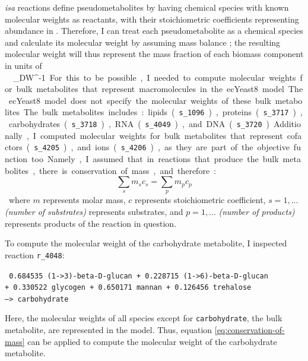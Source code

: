 \textit{isa} reactions define pseudometabolites by having chemical species with known molecular weights as reactants, with their stoichiometric coefficients representing abundance in \SI{}{\mmolgdw}.
Therefore, I can treat each pseudometabolite as a chemical species and calculate its molecular weight by assuming mass balance \parencite{chanStandardizingBiomassReactions2017, dinhQuantifyingPropagationParametric2022, takhaveevTemporalSegregationBiosynthetic2023};
the resulting molecular weight will thus represent the mass fraction of each biomass component in units of \SI{}{\gram~\gram_{DW}^{-1}}.

For this to be possible, I needed to compute molecular weights for bulk metabolites that represent macromolecules in the ecYeast8 model.
The ecYeast8 model does not specify the molecular weights of these bulk metabolites.
The bulk metabolites includes: lipids (\texttt{s\_1096}), proteins (\texttt{s\_3717}), carbohydrates (\texttt{s\_3718}), RNA (\texttt{s\_4049}), and DNA (\texttt{s\_3720}).
Additionally, I computed molecular weights for bulk metabolites that represent cofactors (\texttt{s\_4205}), and ions (\texttt{s\_4206}), as they are part of the objective function too.
Namely, I assumed that in reactions that produce the bulk metabolites, there is conservation of mass, and therefore:

\begin{equation}
  \sum_{s}m_{s}c_{s} = \sum_{p}m_{p}c_{p}
\label{eq:conservation-of-mass}
\end{equation}

where $m$ represents molar mass, $c$ represents stoichiometric coefficient, $s = 1, ...$ \emph{(number of substrates)} represents substrates, and $p = 1, ...$ \emph{(number of products)} represents products of the reaction in question.

To compute the molecular weight of the carbohydrate metabolite, I inspected reaction \texttt{r\_4048}:

\texttt{
  0.684535 (1->3)-beta-D-glucan + 0.228715 (1->6)-beta-D-glucan \\
  + 0.330522 glycogen + 0.650171 mannan + 0.126456 trehalose \\
  --> carbohydrate
}

Here, the molecular weights of all species except for \texttt{carbohydrate}, the bulk metabolite, are represented in the model.
Thus, equation \ref{eq:conservation-of-mass} can be applied to compute the molecular weight of the carbohydrate metabolite.

